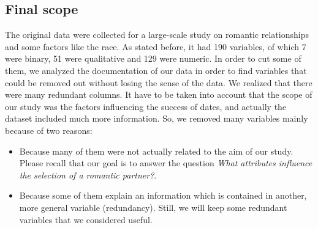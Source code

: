 \begin{comment}
	7.0 & Almost never & \  & \  & \  & \  & \  & \  & \  \\ \hline
	dec &  & Decision of subject & Boolean &  & *empty cell &  &  & Explanatory \\ \hline
	like &  & How much does subject like partner & Number &  & *empty cell &  & [1,10] & Explanatory \\ \hline
	imprelig &  & Importance to subject that partner is the same religion background & Number &  & *empty cell &  & [1,10] & Explanatory \\ \hline
	diff\_age &  & Absolute difference of between partners age & Number &  & *empty cell &  & [1,10] & Explanatory \\ \hline
	university &  & Whether the person attended (or is attending) university & Boolean &  & *empty cell &  & & Explanatory \\ \hline
	
\end{array}
\]}
\end{comment}



\subsection{Final scope}
The original data were collected for a large-scale study on romantic relationships and some factors like the race. As stated before, it had 190 variables, of which 7 were binary, 51 were qualitative and 129 were numeric. In order to cut some of them, we analyzed the documentation of our data in order to find variables that could be removed out without losing the sense of the data. We realized that there were many redundant columns. It have to be taken into account that the scope of our study was the factors influencing the success of dates, and actually the dataset included much more information. So, we removed many variables mainly because of two reasons:
\begin{itemize}
    \item Because many of them were not actually related to the aim of our study. Please recall that our goal is to answer the question \textit{What attributes influence the selection of a romantic partner?}.
    \item Because some of them explain an information which is contained in another, more general variable (redundancy). Still, we will keep some redundant variables that we considered useful.
\end{itemize}

